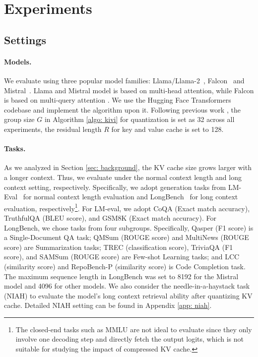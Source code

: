 \section{Experiments}

% 

\subsection{Settings}
\label{sec: setting}
\paragraph{Models.} We evaluate \kivi{} using three popular model families: Llama/Llama-2~\citep{touvron2023llama, touvron2023llama2}, Falcon~\citep{penedo2023refinedweb} and Mistral~\citep{jiang2023mistral}. 
Llama and Mistral model is based on multi-head attention, while Falcon is based on multi-query attention \citep{mqa}.
We use the Hugging Face Transformers codebase and implement the \kivi{} algorithm upon it.
Following previous work \citep{flexgen}, the group size $G$ in Algorithm \ref{algo: kivi} for quantization is set as 32 across all experiments, the residual length $R$ for key and value cache is set to 128.

\paragraph{Tasks.}
As we analyzed in Section \ref{sec: background}, the KV cache size grows larger with a longer context. 
Thus, we evaluate \kivi{} under the normal context length and long context setting, respectively.
Specifically, we adopt generation tasks from LM-Eval~\citep{eval-harness} for normal context length evaluation and LongBench~\citep{bai2023longbench} for long context evaluation, respectively\footnote{The closed-end tasks such as MMLU are not ideal to evaluate \kivi{} since they only involve one decoding step and directly fetch the output logits, which is not suitable for studying the impact of compressed KV cache.}. 
For LM-eval, we adopt CoQA (Exact match accuracy), TruthfulQA (BLEU score), and GSM8K (Exact match accuracy). 
For LongBench, we chose tasks from four subgroups. 
Specifically, Qasper (F1 score) is a Single-Document QA task; QMSum (ROUGE score) and MultiNews (ROUGE score) are Summarization tasks; TREC (classification score), TriviaQA (F1 score), and SAMSum (ROUGE score) are Few-shot Learning tasks; and LCC (similarity score) and RepoBench-P (similarity score) is Code Completion task. The maximum sequence length in LongBench was set to 8192 for the Mistral model and 4096 for other models.
We also consider the needle-in-a-haystack task (NIAH) to evaluate the model's long context retrieval ability after quantizing KV cache.
Detailed NIAH setting can be found in Appendix \ref{app: niah}.

